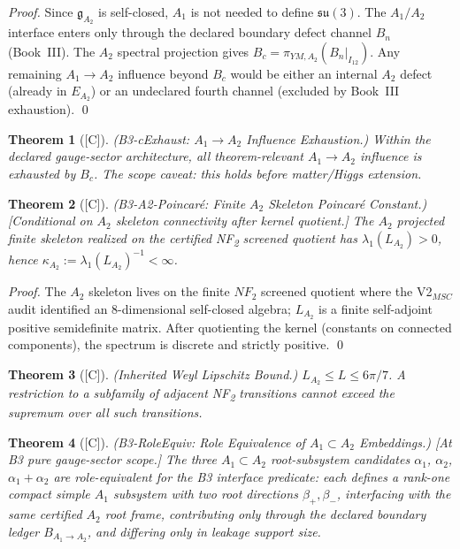 \documentclass[12pt,oneside]{amsbook}
\theoremstyle{plain}
\newtheorem{theorem}{Theorem}[section]
\theoremstyle{definition}
\theoremstyle{remark}
\newcommand{\status}[1]{\textup{[#1]}}
\begin{document}
\begin{proof}
Since $\mathfrak{g}_{A_2}$ is self-closed, $A_1$ is not needed to
define $\mathfrak{su}(3)$. The $A_1/A_2$ interface enters only
through the declared boundary defect channel $B_n$ (Book~III). The
$A_2$ spectral projection gives $B_c = \pi_{YM,A_2}(B_n|_{I_{12}})$.
Any remaining $A_1\to A_2$ influence beyond $B_c$ would be either an
internal $A_2$ defect (already in $E_{A_2}$) or an undeclared fourth
channel (excluded by Book~III exhaustion).
\qed
\end{proof}

\begin{theorem}[\status{C}]\label{thm:B3-c-exhaust}
\textup{(B3-cExhaust: $A_1\to A_2$ Influence Exhaustion.)}
Within the declared gauge-sector architecture, all theorem-relevant
$A_1\to A_2$ influence is exhausted by $B_c$. The scope caveat: this
holds before matter/Higgs extension.
\end{theorem}

\begin{theorem}[\status{C}]\label{thm:B3-A2-Poincare}
\textup{(B3-A2-Poincar\'{e}: Finite $A_2$ Skeleton Poincar\'{e} Constant.)}
\textup{[Conditional on $A_2$ skeleton connectivity after kernel quotient.]}
The $A_2$ projected finite skeleton realized on the certified
NF\textsubscript{2} screened quotient has
$\lambda_1(L_{A_2}) > 0$, hence
$\kappa_{A_2} := \lambda_1(L_{A_2})^{-1} < \infty$.
\end{theorem}

\begin{proof}
The $A_2$ skeleton lives on the finite $NF_2$ screened quotient where
the V2$_{MSC}$ audit identified an 8-dimensional self-closed algebra;
$L_{A_2}$ is a finite self-adjoint positive semidefinite matrix.
After quotienting the kernel (constants on connected components),
the spectrum is discrete and strictly positive.
\qed
\end{proof}

\begin{theorem}[\status{C}]\label{thm:B3-L-bound}
\textup{(Inherited Weyl Lipschitz Bound.)}
$L_{A_2} \le L \le 6\pi/7$.
A restriction to a subfamily of adjacent NF\textsubscript{2}
transitions cannot exceed the supremum over all such transitions.
\end{theorem}

\begin{theorem}[\status{C}]\label{thm:B3-role-equiv}
\textup{(B3-RoleEquiv: Role Equivalence of $A_1\subset A_2$ Embeddings.)}
\textup{[At B3 pure gauge-sector scope.]}
The three $A_1\subset A_2$ root-subsystem candidates
$\alpha_1$, $\alpha_2$, $\alpha_1+\alpha_2$
are role-equivalent for the B3 interface predicate: each defines
a rank-one compact simple $A_1$ subsystem with two root directions
$\beta_+, \beta_-$, interfacing with the same certified $A_2$ root frame,
contributing only through the declared boundary ledger $B_{A_1\to A_2}$,
and differing only in leakage support size.
\end{theorem}
\end{document}
